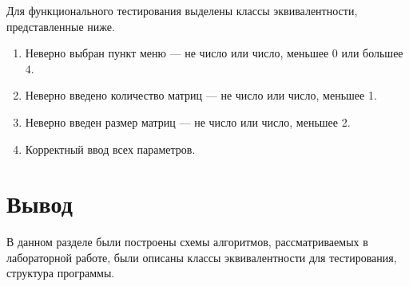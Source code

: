 Для функционального тестирования выделены классы эквивалентности, представленные ниже.

\begin{enumerate}
	\item Неверно выбран пункт меню --- не число или число, меньшее 0 или большее 4.
	\item Неверно введено количество матриц --- не число или число, меньшее 1.
	\item Неверно введен размер матриц --- не число или число, меньшее 2.
	\item Корректный ввод всех параметров.
\end{enumerate}


\section{Вывод}

В данном разделе были построены схемы алгоритмов, рассматриваемых в лабораторной работе, были описаны классы эквивалентности для тестирования, структура программы.
